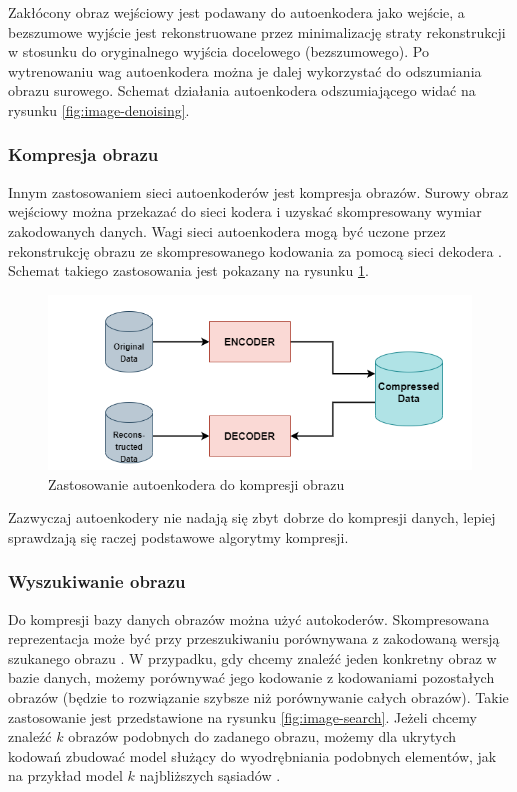 \documentclass[12pt]{mwbk}
\theoremstyle{plain}
\theoremstyle{definition}
\theoremstyle{remark}
\newcommand\zrodlo[1]{\par\vspace{-3mm}{\small\textit{Źródło: }#1 }}
\begin{document}
Zakłócony obraz wejściowy jest podawany do autoenkodera jako wejście, a bezszumowe wyjście jest rekonstruowane przez minimalizację straty rekonstrukcji w stosunku do oryginalnego wyjścia docelowego (bezszumowego). Po wytrenowaniu wag autoenkodera można je dalej wykorzystać do odszumiania obrazu surowego. Schemat działania autoenkodera odszumiającego widać na rysunku \ref{fig:image-denoising}.

\subsubsection{Kompresja obrazu}

Innym zastosowaniem sieci autoenkoderów jest kompresja obrazów. Surowy obraz wejściowy można przekazać do sieci kodera i uzyskać skompresowany wymiar zakodowanych danych. Wagi sieci autoenkodera mogą być uczone przez rekonstrukcję obrazu ze skompresowanego kodowania za pomocą sieci dekodera \cite{kumar}. Schemat takiego zastosowania jest pokazany na rysunku \ref{fig:image-compression}.

\begin{figure}[!h]
	\centering
	\includegraphics[width=0.8\linewidth]{rys/image_compression.png}
	\caption{Zastosowanie autoenkodera do kompresji obrazu}
	\zrodlo{\cite{kumar}}
	\label{fig:image-compression}
\end{figure}

Zazwyczaj autoenkodery nie nadają się zbyt dobrze do kompresji danych, lepiej sprawdzają się raczej podstawowe algorytmy kompresji.

\subsubsection{Wyszukiwanie obrazu}

Do kompresji bazy danych obrazów można użyć autokoderów. Skompresowana reprezentacja może być przy przeszukiwaniu porównywana z zakodowaną wersją szukanego obrazu \cite{kumar}. W przypadku, gdy chcemy znaleźć jeden konkretny obraz w bazie danych, możemy porównywać jego kodowanie z kodowaniami pozostałych obrazów (będzie to rozwiązanie szybsze niż porównywanie całych obrazów). Takie zastosowanie jest przedstawione na rysunku \ref{fig:image-search}. Jeżeli chcemy znaleźć $k$ obrazów podobnych do zadanego obrazu, możemy dla ukrytych kodowań zbudować model służący do wyodrębniania podobnych elementów, jak na przykład model $k$ najbliższych sąsiadów \cite{wong}.
\end{document}
